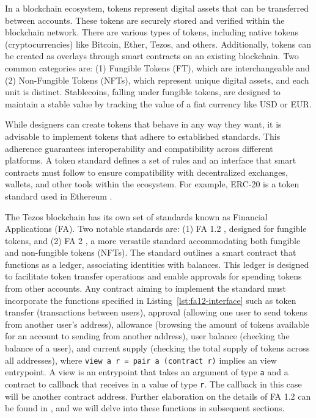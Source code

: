 \documentclass[a4paper,USenglish,cleveref, autoref,anonymous]{lipics-v2021}
\begin{document}
In a blockchain ecosystem, tokens represent digital assets that can be
transferred between accounts. These tokens are securely stored and
verified within the blockchain network. There are various types of
tokens, including native tokens (cryptocurrencies) like Bitcoin,
Ether, Tezos, and others. Additionally, tokens can be created as
overlays through smart contracts on an existing blockchain. Two common
categories are: (1) Fungible Tokens (FT), which are interchangeable
and (2) Non-Fungible Tokens (NFTs), which represent unique digital
assets, and each unit is distinct. Stablecoins, falling under fungible
tokens, are designed to maintain a stable value by tracking the value
of a fiat currency like USD or EUR.

While designers can create tokens that behave in any way they want, it
is advisable to implement tokens that adhere to established standards.
This adherence guarantees interoperability and compatibility across
different platforms. A token standard defines a set of rules and an
interface that smart contracts must follow to ensure compatibility
with decentralized exchanges, wallets, and other tools within the
ecosystem. For example, ERC-20 \cite{erc} is a token standard used in Ethereum \cite{eth-whitepaper}.  


The Tezos blockchain has its own set of standards known as Financial
Applications (FA). Two notable standards are: (1) FA 1.2 \cite{fa}, designed for
fungible tokens, and (2) FA 2 \cite{fas}, a more versatile standard accommodating
both fungible and non-fungible tokens (NFTs). The standard outlines a
smart contract that functions as a ledger, associating identities with
balances. This ledger is designed to facilitate token transfer
operations and enable approvals for spending tokens from other
accounts. Any contract aiming to implement the standard must
incorporate the functions specified in
Listing~\ref{lst:fa12-interface} such as token transfer (transactions
between users), approval (allowing one user to send tokens from
another user's address),  allowance (browsing the amount of tokens
available for an account to sending from another address), user
balance (checking the balance of a user), and current supply (checking
the total supply of tokens across all addresses), where
\lstinline/view a r = pair a (contract r)/ implies an view entrypoint.
A view is an entrypoint that takes an
argument of type \lstinline/a/ and a contract to callback that receives in a value
of type \lstinline/r/. The callback in this case will be another
contract address. Further elaboration on the details of FA 1.2 can be
found in \cite{fatzip}, and we will delve into
these functions in subsequent 
sections.
\end{document}
